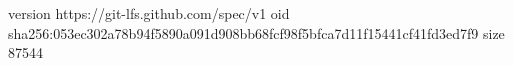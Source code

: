 version https://git-lfs.github.com/spec/v1
oid sha256:053ec302a78b94f5890a091d908bb68fcf98f5bfca7d11f15441cf41fd3ed7f9
size 87544
